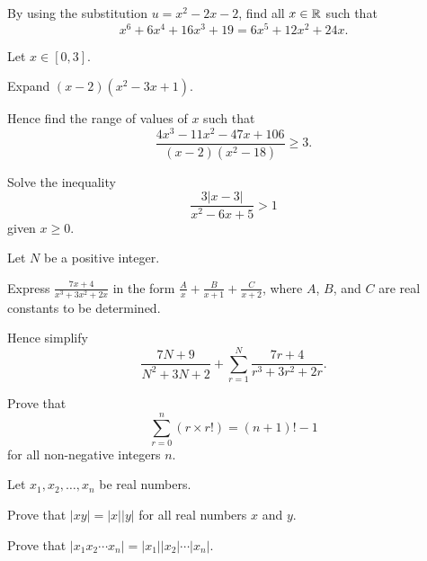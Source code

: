 \begin{problem}
    By using the substitution $u = x^2 - 2x - 2$, find all $x \in \mathbb{R}$ such that
    \[
        x^6 + 6x^4 + 16x^3 + 19 = 6x^5 + 12x^2 + 24x.
    \]
\end{problem}

\begin{problem}
    Let $x \in [0,3]$.
    \begin{partquestions}{\roman*}
        \item Expand $(x-2)(x^2-3x+1)$.
        \item Hence find the range of values of $x$ such that
        \[
            \frac{4x^3 - 11x^2 - 47x + 106}{(x-2)(x^2-18)} \geq 3.
        \]
    \end{partquestions}
\end{problem}

\begin{problem}
    Solve the inequality
    \[
        \frac{3|x-3|}{x^2-6x+5} > 1
    \]
    given $x \geq 0$.
\end{problem}

\begin{problem}
    Let $N$ be a positive integer.
    \begin{partquestions}{\roman*}
        \item Express $\frac{7x+4}{x^3+3x^2+2x}$ in the form $\frac{A}{x} + \frac{B}{x+1} + \frac{C}{x+2}$, where $A$, $B$, and $C$ are real constants to be determined.
        \item Hence simplify
        \[
            \frac{7N+9}{N^2+3N+2} + \sum_{r=1}^N \frac{7r+4}{r^3+3r^2+2r}.
        \]
    \end{partquestions}
\end{problem}

\begin{problem}
    Prove that
    \[
        \sum_{r=0}^n (r\times r!) = (n+1)! - 1
    \]
    for all non-negative integers $n$.
\end{problem}

\begin{problem}\label{problem-absolute-value-is-multiplicative-map}
    Let $x_1, x_2, \dots, x_n$ be real numbers.
    \begin{partquestions}{\roman*}
        \item Prove that $|xy| = |x||y|$ for all real numbers $x$ and $y$.
        \item Prove that $|x_1x_2\cdots x_n| = |x_1||x_2|\cdots|x_n|$.
    \end{partquestions}
\end{problem}
